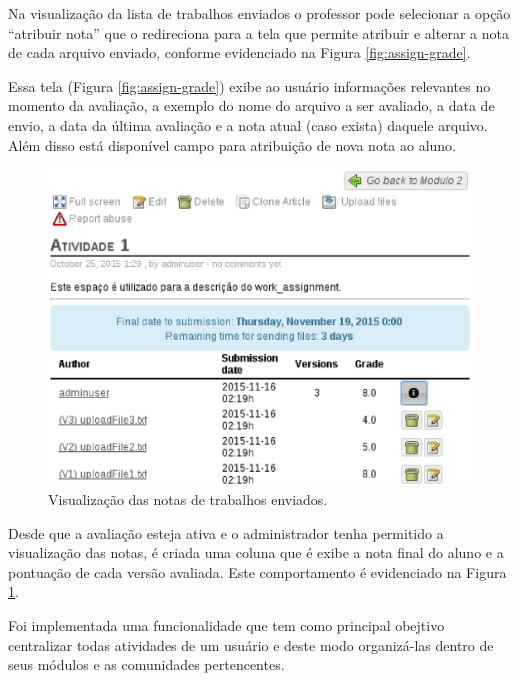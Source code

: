Na visualização da lista de trabalhos enviados o professor pode selecionar a opção ``atribuir nota'' que o redireciona para a tela que permite atribuir e alterar a nota de cada arquivo enviado, conforme evidenciado na Figura \ref{fig:assign-grade}.

Essa tela (Figura \ref{fig:assign-grade}) exibe ao usuário informações relevantes no momento da avaliação, a exemplo do nome do arquivo a ser avaliado, a data de envio, a data da última avaliação e a nota atual (caso exista) daquele arquivo. Além disso está disponível campo para atribuição de nova nota ao aluno.

\begin{figure}[h]
    \centering
    \includegraphics[keepaspectratio=true,scale=0.6]
      {figuras/visualiza-notas.eps}
    \caption{Visualização das notas de trabalhos enviados.}
    \label{fig:visualiza-notas}
\end{figure}

Desde que a avaliação esteja ativa e o administrador tenha permitido a visualização das notas, é criada uma coluna que é exibe a nota final do aluno e a pontuação de cada versão avaliada. Este comportamento é evidenciado na Figura \ref{fig:visualiza-notas}.

Foi implementada uma funcionalidade que tem como principal obejtivo centralizar todas atividades de um usuário e deste modo organizá-las dentro de seus módulos e as comunidades pertencentes.

